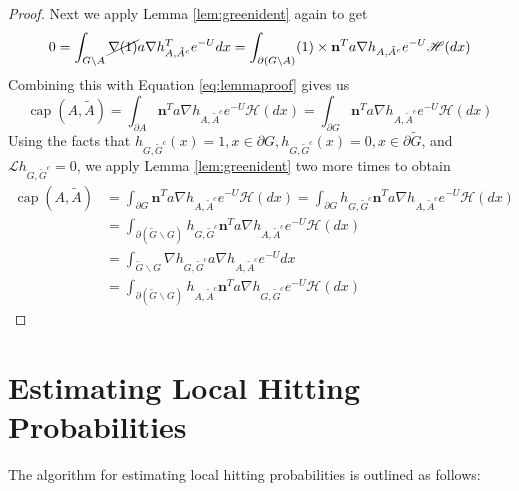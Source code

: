 \documentclass[english, aip, jcp, priprint, graphicx,floatfix]{revtex4-1}
\newcommand{\tmop}[1]{\ensuremath{\operatorname{#1}}}
\theoremstyle{plain}
\theoremstyle{definition}
\theoremstyle{plain}
\newcommand{\hausdorffmeasure}{\mathscr{H}(dx)}
\begin{document}
\begin{proof}
Next we apply Lemma \ref{lem:greenident} again to get
\begin{align*}
	0 = \int_{G \backslash A} \cancel{\nabla (1)} a \nabla h_{A,\tilde A^c}^T e^{- U } dx = \int_{\partial (G\backslash A)} (1) \times \textbf{n}^T a  \nabla h_{A,\tilde A^c} e^{- U } \hausdorffmeasure
\end{align*}
Combining this with Equation \ref{eq:lemmaproof} gives us
\begin{equation*}
\tmop{cap}(A,\tilde A)  = \int_{\partial A}  \textbf{n}^T a  \nabla h_{A, \tilde{A}^c} e^{- U } \hausdorffmeasure = \int_{\partial G}  \textbf{n}^T a  \nabla h_{A, \tilde{A}^c} e^{- U } \hausdorffmeasure
\end{equation*}
Using the facts that $h_{G,\tilde G^c}(x)=1,x\in \partial G,h_{G,\tilde G^c}(x)=0,x\in \partial \tilde G$, and $\mathcal{L} h_{G, \tilde G^c} = 0$, we apply Lemma \ref{lem:greenident} two more times to obtain 
\begin{align*}
	\tmop{cap}(A,\tilde A)  &= \int_{\partial G}  \textbf{n}^T a  \nabla h_{A, \tilde{A}^c} e^{- U } \hausdorffmeasure = \int_{\partial G}  h_{G, \tilde{G}^c} \textbf{n}^T a   \nabla h_{A, \tilde{A}^c} e^{- U } \hausdorffmeasure\\
				&= \int_{\partial (\tilde G \backslash G)}  h_{G, \tilde{G}^c} \textbf{n}^T a   \nabla h_{A, \tilde{A}^c} e^{- U } \hausdorffmeasure \\
				&= \int_{\tilde G \backslash G}  \nabla h_{G, \tilde{G}^c} a \nabla h_{A, \tilde{A}^c} e^{- U } dx\\
				&= \int_{\partial (\tilde G \backslash G)}  h_{A, \tilde{A}^c}    \textbf{n}^T a  \nabla h_{G, \tilde{G}^c} e^{- U } \hausdorffmeasure
\end{align*}

\end{proof}

\section{Estimating Local Hitting Probabilities}\label{algorithm}
The algorithm for estimating local hitting probabilities is outlined as follows:
\end{document}
